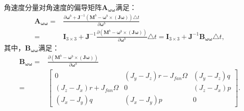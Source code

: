 角速度分量对角速度的偏导矩阵$\boldsymbol{A}_{\boldsymbol{\omega \omega}}$满足：
\begin{equation}
    \begin{aligned}
        \boldsymbol{A}_{\boldsymbol{\omega \omega}} =& \frac{\partial \boldsymbol{\omega}^b + \boldsymbol{J}^{-1} (\boldsymbol{M}^b - \boldsymbol{\omega}^b \times (\boldsymbol{J}\boldsymbol{\omega}))\triangle t}{\partial \boldsymbol{\omega}^b} \\
        =& \boldsymbol{I}_{3 \times 3} + \boldsymbol{J}^{-1} \frac{\partial (\boldsymbol{M}^b - \boldsymbol{\omega}^b \times (\boldsymbol{J}\boldsymbol{\omega})) }{\partial \boldsymbol{\omega}^b} \triangle t = \boldsymbol{I}_{3 \times 3} + \boldsymbol{J}^{-1} \boldsymbol{B}_{\boldsymbol{\omega \omega}} \triangle t,
    \end{aligned}
\end{equation}
其中，$\boldsymbol{B}_{\boldsymbol{\omega \omega}}$满足：
\begin{equation}
    \begin{aligned}
        \boldsymbol{B}_{\boldsymbol{\omega \omega}} =& \frac{\partial (\boldsymbol{M}^b - \boldsymbol{\omega}^b \times (\boldsymbol{J}\boldsymbol{\omega})) }{\partial \boldsymbol{\omega}^b} \\
        =& 
        \begin{bmatrix}
            0 & (J_y - J_z) r - J_{fan} \Omega & (J_y - J_z) q \\[8pt]
            (J_z - J_x) r + J_{fan} \Omega & 0 & (J_z - J_x) p \\[8pt]
            (J_x - J_y) q & (J_x - J_y) p & 0
        \end{bmatrix}.
    \end{aligned}
\end{equation}

